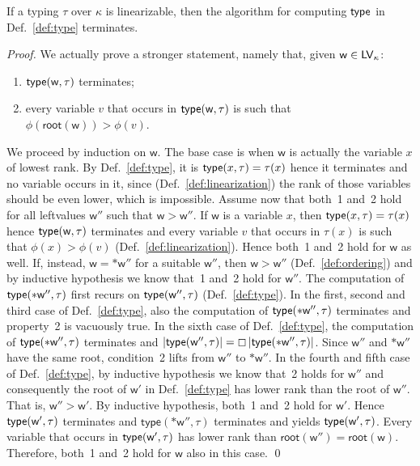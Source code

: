 \begin{proposition}\label{prop:termination}
  If a typing $\tau$ over $\kappa$ is linearizable, then the algorithm for computing $\mathsf{type}$ in
  Def.~\ref{def:type} terminates.
\end{proposition}
\begin{proof}
  We actually prove a stronger statement, namely that, given $\mathsf{w}\in\mathsf{LV}_\kappa$:
  \begin{enumerate}
  \item $\mathsf{type}(\mathsf{w},\tau)$ terminates;
  \item every variable $v$ that occurs in $\mathsf{type}(\mathsf{w},\tau)$
    is such that $\phi(\mathsf{root}(\mathsf{w}))>\phi(v)$.
  \end{enumerate}
  We proceed by induction on $\mathsf{w}$. The base case is when $\mathsf{w}$ is actually the variable $x$
  of lowest rank. By Def.~\ref{def:type}, it is $\mathsf{type}(x,\tau)=\tau(x)$ hence it terminates and
  no variable occurs in it, since (Def.~\ref{def:linearization})
  the rank of those variables should be even lower, which is impossible.
  Assume now that both~1 and~2 hold for all leftvalues
  $\mathsf{w}''$ such that $\mathsf{w}>\mathsf{w}''$.
  If $\mathsf{w}$ is a variable $x$, then $\mathsf{type}(x,\tau)=\tau(x)$ hence
  $\mathsf{type}(\mathsf{w},\tau)$ terminates and every variable $v$ that occurs in $\tau(x)$ is such that
  $\phi(x)>\phi(v)$ (Def.~\ref{def:linearization}). Hence both~1 and~2 hold for $\mathsf{w}$ as well.
  If, instead, $\mathsf{w}=\mathtt{*}\mathsf{w}''$ for a suitable $\mathsf{w}''$,
  then $\mathsf{w}>\mathsf{w}''$ (Def.~\ref{def:ordering}) and by inductive hypothesis we know that~1
  and~2 hold for $\mathsf{w}''$. The computation of $\mathsf{type}(\mathtt{*}\mathsf{w}'',\tau)$
  first recurs on $\mathsf{type}(\mathsf{w}'',\tau)$ (Def.~\ref{def:type}).
  In the first, second and third case of Def.~\ref{def:type}, also the
  computation of $\mathsf{type}(\mathtt{*}\mathsf{w}'',\tau)$ terminates and property~2 is vacuously true.
  In the sixth case of Def.~\ref{def:type}, the computation of
  $\mathsf{type}(\mathtt{*}\mathsf{w}'',\tau)$ terminates and
  $|\mathsf{type}(\mathsf{w}'',\tau)|=\boxempty\,{|\mathsf{type}(\mathtt{*}\mathsf{w}'',\tau)|}$.
  Since $\mathsf{w}''$ and $\mathtt{*}\mathsf{w}''$ have the same root, condition~2
  lifts from $\mathsf{w}''$ to $\mathtt{*}\mathsf{w}''$.
  In the fourth and fifth case of Def.~\ref{def:type}, by inductive hypothesis we know that~2 holds
  for $\mathsf{w}''$ and consequently the root of $\mathsf{w}'$ in Def.~\ref{def:type}
  has lower rank than the root of $\mathsf{w}''$. That is, $\mathsf{w}''>\mathsf{w}'$.
  By inductive hypothesis, both~1 and~2 hold for $\mathsf{w}'$. Hence
  $\mathsf{type}(\mathsf{w}',\tau)$ terminates and
  $\mathsf{type}(\mathtt{*}\mathsf{w}'',\tau)$ terminates and yields
  $\mathsf{type}(\mathsf{w}',\tau)$.
  Every variable that occurs in
  $\mathsf{type}(\mathsf{w}',\tau)$ has lower rank than
  $\mathsf{root}(\mathsf{w}'')=\mathsf{root}(\mathsf{w})$. Therefore,
  both~1 and~2 hold for $\mathsf{w}$ also in this case.
  \qed
\end{proof}

